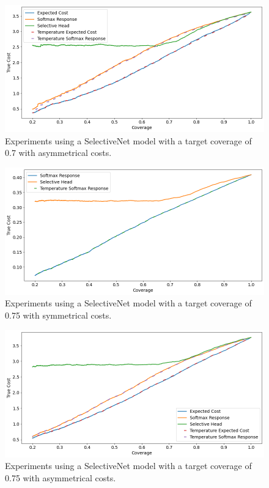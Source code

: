 \begin{figure}[h]
	\includegraphics[width=\textwidth]{images/multi-class/sn0.7-asym.png}
	\caption*{Experiments using a SelectiveNet model with a target coverage of 0.7 with asymmetrical costs.}
\end{figure}

\begin{figure}[h]
	\includegraphics[width=\textwidth]{images/multi-class/sn0.75-sym.png}
	\caption*{Experiments using a SelectiveNet model with a target coverage of 0.75 with symmetrical costs.}
\end{figure}

\begin{figure}[h]
	\includegraphics[width=\textwidth]{images/multi-class/sn0.75-asym.png}
	\caption*{Experiments using a SelectiveNet model with a target coverage of 0.75 with asymmetrical costs.}
\end{figure}

